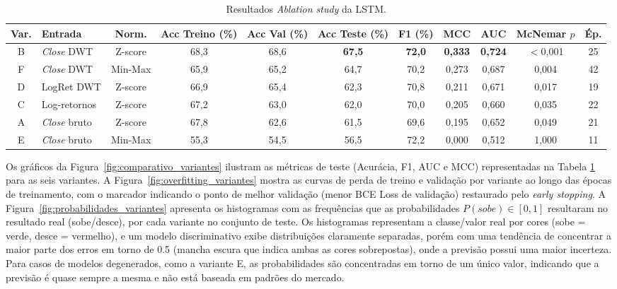 \begin{landscape}
\begin{table}[H]
\centering
\caption{Resultados \textit{Ablation study} da LSTM.}
\label{tab:variantes}
\small
\begin{tabular}{@{}clccccccccc@{}}
\toprule
\textbf{Var.} & \textbf{Entrada} & \textbf{Norm.} & \textbf{Acc Treino (\%)} & \textbf{Acc Val (\%)} & \textbf{Acc Teste (\%)} & \textbf{F1 (\%)} & \textbf{MCC} & \textbf{AUC} & \textbf{McNemar $p$} & \textbf{Ép.} \\
\midrule
B & \textit{Close} DWT  & Z-score  & 68{,}3 & 68{,}6 & \textbf{67,5} & \textbf{72,0} & \textbf{0,333} & \textbf{0,724} & $<$0,001 & 25 \\
F & \textit{Close} DWT  & Min-Max  & 65{,}9 & 65{,}2 & 64{,}7 & 70{,}2 & 0{,}273 & 0{,}687 & 0,004 & 42 \\
D & LogRet DWT         & Z-score  & 66{,}9 & 65{,}4 & 62{,}3 & 70{,}8 & 0{,}211 & 0{,}671 & 0,017 & 19 \\
C & Log-retornos & Z-score & 67{,}2 & 63{,}0 & 62{,}0 & 70{,}0 & 0{,}205 & 0{,}660 & 0,035 & 22 \\
A & \textit{Close} bruto & Z-score & 67{,}8 & 62{,}6 & 61{,}5 & 69{,}6 & 0{,}195 & 0{,}652 & 0,049 & 21 \\
E & \textit{Close} bruto & Min-Max & 55{,}3 & 54{,}5 & 56{,}5 & 72{,}2 & 0{,}000 & 0{,}512 & 1,000 & 11 \\
\bottomrule
\end{tabular}
\end{table}
\end{landscape}

Os gráficos da Figura~\ref{fig:comparativo_variantes} ilustram as métricas de teste (Acurácia, F1, AUC e MCC) representadas na Tabela \ref{tab:variantes} para as seis variantes. A Figura~\ref{fig:overfitting_variantes} mostra as curvas de perda de treino e validação por variante ao longo das épocas de treinamento, com o marcador indicando o ponto de melhor validação (menor BCE Loss de validação) restaurado pelo \textit{early stopping}. A Figura~\ref{fig:probabilidades_variantes} apresenta os histogramas com as frequências que as probabilidades $P(\textit{sobe}) \in [0,1]$ resultaram no resultado real (sobe/desce), por cada variante no conjunto de teste. Os histogramas representam a classe/valor real por cores (sobe = verde, desce = vermelho), e um modelo discriminativo exibe distribuições claramente separadas, porém com uma tendência de concentrar a maior parte dos erros em torno de 0.5 (mancha escura que indica ambas as cores sobrepostas), onde a previsão possui uma maior incerteza. Para casos de modelos degenerados, como a variante E, as probabilidades são concentradas em torno de um único valor, indicando que a previsão é quase sempre a mesma e não está baseada em padrões do mercado.

